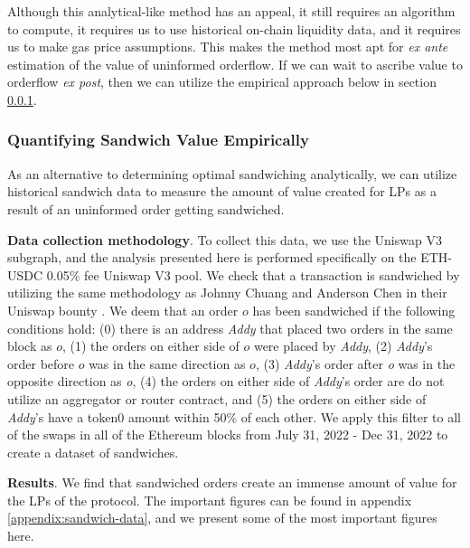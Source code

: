 
        Although this analytical-like method has an appeal, it still requires an algorithm to compute, it requires us to use historical on-chain liquidity data, and it requires us to make gas price assumptions. This makes the method most apt for \textit{ex ante} estimation of the value of uninformed orderflow. If we can wait to ascribe value to orderflow \textit{ex post}, then we can utilize the empirical approach below in section \ref{section:sandwich-value-empirical}.

    
    \subsubsection{Quantifying Sandwich Value Empirically} \label{section:sandwich-value-empirical}
    
        As an alternative to determining optimal sandwiching analytically, we can utilize historical sandwich data to measure the amount of value created for LPs as a result of an uninformed order getting sandwiched.

        \textbf{Data collection methodology}. 
        To collect this data, we use the Uniswap V3 subgraph, and the analysis presented here is performed specifically on the ETH-USDC 0.05\% fee Uniswap V3 pool. We check that a transaction is sandwiched by utilizing the same methodology as Johnny Chuang and Anderson Chen in their Uniswap bounty 
        \cite{chuang2022mev}. 
        We deem that an order $o$ has been sandwiched if the following conditions hold: (0) there is an address \textit{Addy} that placed two orders in the same block as $o$, (1) the orders on either side of $o$ were placed by \textit{Addy}, (2) \textit{Addy}'s order before $o$ was in the same direction as $o$, (3) \textit{Addy}'s order after \textit{o} was in the opposite direction as \textit{o}, (4) the orders on either side of \textit{Addy}'s order are do not utilize an aggregator or router contract, and (5) the orders on either side of \textit{Addy}'s have a token0 amount within 50\% of each other. We apply this filter to all of the swaps in all of the Ethereum blocks from July 31, 2022 - Dec 31, 2022 to create a dataset of sandwiches.

        \textbf{Results}.
        We find that sandwiched orders create an immense amount of value for the LPs of the protocol.
        The important figures can be found in appendix \ref{appendix:sandwich-data}, and we present some of the most important figures here.
        
